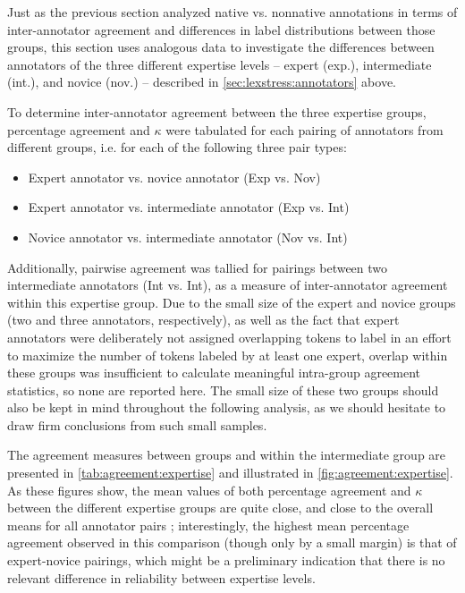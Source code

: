 	
	Just as the previous section analyzed native vs. nonnative annotations in terms of inter-annotator agreement and differences in label distributions between those groups, this section uses analogous data to investigate the differences between annotators of the three different expertise levels -- expert (exp.), intermediate (int.), and novice (nov.) -- described in \cref{sec:lexstress:annotators} above.
	
	To determine inter-annotator agreement between the three expertise groups, percentage agreement and $\kappa$ were tabulated for each pairing of annotators from different groups, i.e. for each of the following three pair types:
	\begin{itemize}[topsep=-1em]
	\item{Expert annotator vs. novice annotator (Exp vs. Nov)}
	\item{Expert annotator vs. intermediate annotator (Exp vs. Int)}
	\item{Novice annotator vs. intermediate annotator (Nov vs. Int)}
	\end{itemize}
	Additionally, pairwise agreement was tallied for pairings between two intermediate annotators (Int vs. Int), as a measure of inter-annotator agreement within this expertise group. Due to the small size of the expert and novice groups (two and three annotators, respectively), as well as the fact that expert annotators were deliberately not assigned overlapping tokens to label in an effort to maximize the number of tokens labeled by at least one expert,
	overlap within these groups was insufficient to calculate meaningful intra-group agreement statistics, so none are reported here. The small size of these two groups should also be kept in mind throughout the following analysis, as we should hesitate to draw firm conclusions from such small samples. 
		
		The agreement measures between groups and within the intermediate group are presented in \cref{tab:agreement:expertise} and illustrated in \cref{fig:agreement:expertise}. As these figures show, the mean values of both percentage agreement and $\kappa$ between the different expertise groups are quite close, and close to the overall means for all annotator pairs ;  interestingly, the highest mean percentage agreement observed in this comparison (though only by a small margin) is that of expert-novice pairings, which might be a preliminary indication that there is no relevant difference in reliability between expertise levels. 
			
